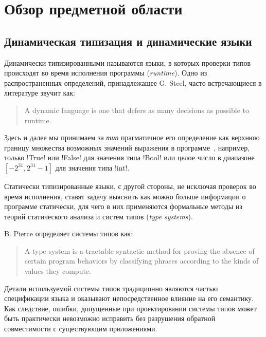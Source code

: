 \chapter{Обзор предметной области}

\section{Динамическая типизация и динамические языки}

Динамически типизированными называются языки, в которых проверки типов
происходят во время исполнения программы (\emph{runtime}). Одно из
распространенных определений, принадлежащее G. Steel, часто встречающиеся
в литературе звучит как:

\begin{quote}
  A dynamic language is one that defers as many decisions as possible to
  runtime.
\end{quote}


Здесь и далее мы принимаем за \emph{тип} прагматичное его определение как
верхнюю границу множества возможных значений выражения в
программе~\cite{Cardelli2004}, например, только !True! или !False! для значения
типа !Bool! или целое число в диапазоне $[-2^31, 2^31-1]$ для значения типа
!int!.

Статически типизированные языки, с другой стороны, не исключая проверок во время
исполнения, ставят задачу выяснить как можно больше информации о программе
статически, для чего в них применяются формальные методы из теорий статического
анализа и систем типов (\emph{type systems}). 

B. Pierce определяет системы типов как:

\begin{quote}
  A type system is a tractable syntactic method for proving the absence of certain
  program behaviors by classifying phrases according to the kinds of values they
  compute.
\end{quote}

Детали используемой системы типов традиционно являются частью спецификации языка
и оказывают непосредственное влияние на его семантику. Как следствие, ошибки,
допущенные при проектировании системы типов может быть практически невозможно
исправить без разрушения обратной совместимости с существующим приложениями.

